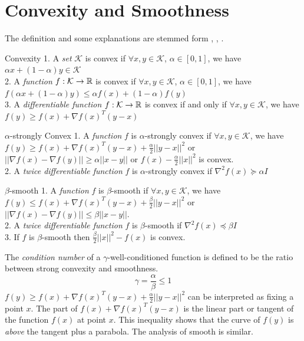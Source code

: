 	\section{Convexity and Smoothness} 
	The definition and some explanations are stemmed form \cite{hazan2023introductiononlineconvexoptimization}, \cite{gormley2023introductiononlineconvexoptimization}, \cite{aaron2017convexity}.
		\begin{defn}{Convexity}{}
			1. A \emph{set} $\mathcal{K}$ is convex if $\forall x,y\in \mathcal{K}$, $\alpha\in [0,1]$, we have $\alpha x+(1-\alpha)y\in \mathcal{K}$ \\
			2. A \emph{function} $f:\mathcal{K}\rightarrow \mathbb{R}$ is convex if $\forall x,y\in \mathcal{K}$, $\alpha\in [0,1]$, we have $f(\alpha x+(1-\alpha)y)\le \alpha f(x)+(1-\alpha)f(y)$ \\
			3. A \emph{differentiable function} $f:\mathcal{K}\rightarrow \mathbb{R}$ is convex if and only if  $\forall x,y\in \mathcal{K}$, we have $f(y)\ge f(x)+\nabla f(x)^T(y-x)$
		\end{defn}
	
		\begin{defn}{$\alpha$-strongly Convex}{}
			1. A \emph{function} $f$ is $\alpha$-strongly convex if $\forall x,y\in \mathcal{K}$, we have $ f(y)\ge f(x)+\nabla f(x)^T(y-x)+\frac{\alpha}{2}||y-x||^2$ or $||\nabla f(x)-\nabla f(y)||\ge \alpha ||x-y||$ or $f(x)-\frac{\alpha}{2}||x||^2$ is convex.\\
			2. A \emph{twice differentiable function} $f$ is $\alpha$-strongly convex if $\nabla^2 f(x)\succeq \alpha I$\\
			
		\end{defn}
		
		\begin{defn}{$\beta$-smooth}{}
			1. A \emph{function} $f$ is $\beta$-smooth if $\forall x,y\in \mathcal{K}$, we have $ f(y)\le f(x)+\nabla f(x)^T(y-x)+\frac{\beta}{2}||y-x||^2$ or $||\nabla f(x)-\nabla f(y)||\le \beta ||x-y||$. \\
			2. A \emph{twice differentiable function} $f$ is $\beta$-smooth if $\nabla^2 f(x) \preceq \beta I$\\
			3. If $f$ is $\beta$-smooth then $\frac{\beta}{2}||x||^2-f(x)$ is convex.
		\end{defn}
		 
		 The \emph{condition number} of a $\gamma$-well-conditioned function is defined to be the ratio between strong convexity and smoothness.
		 $$
		 \gamma = \frac{\alpha}{\beta} \le1
		 $$
		 $ f(y)\ge f(x)+\nabla f(x)^T(y-x)+\frac{\alpha}{2}||y-x||^2$ can be interpreted as fixing a point $x$. The part of $f(x)+\nabla f(x)^T(y-x)$ is the linear part or tangent of the function $f(x)$ at point $x$. This inequality shows that the curve of $f(y)$ is \emph{above} the tangent plus a parabola. The analysis of smooth is similar.
		 
